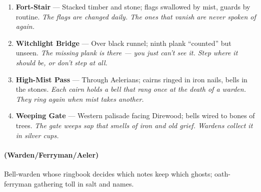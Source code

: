 \begin{enumerate}
\item[J] \textbf{Fort-Stair} --- Stacked timber and stone; flags swallowed by mist, guards by routine. 
  \hfill \textit{The flags are changed daily. The ones that vanish are never spoken of again.}
\item[Q] \textbf{Witchlight Bridge} --- Over black runnel; ninth plank ``counted'' but unseen. 
  \hfill \textit{The missing plank is there --- you just can't see it. Step where it should be, or don't step at all.}
\item[K] \textbf{High-Mist Pass} --- Through Aelerians; cairns ringed in iron nails, bells in the stones. 
  \hfill \textit{Each cairn holds a bell that rang once at the death of a warden. They ring again when mist takes another.}
\item[A] \textbf{Weeping Gate} --- Western palisade facing Direwood; bells wired to bones of trees.  
  \hfill \textit{The gate weeps sap that smells of iron and old grief. Wardens collect it in silver cups.}
\end{enumerate}

\paragraph*{(Warden/Ferryman/Aeler)} Bell-warden whose ringbook decides which notes keep which ghosts; oath-ferryman gathering toll in salt and names.

